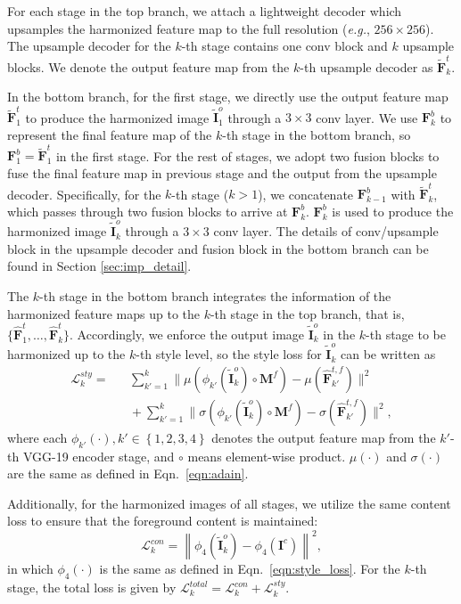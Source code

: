 \documentclass[letterpaper]{article} %
\begin{document}
For each stage in the top branch, we attach a lightweight decoder which upsamples the harmonized feature map to the full resolution (\emph{e.g.}, $256\times 256$). The upsample decoder for the $k$-th stage contains one conv block and $k$ upsample blocks. We denote the output feature map from the $k$-th upsample decoder as $\tilde{\bm{F}}^t_k$.

In the bottom branch, for the first stage, we directly use the output feature map $\tilde{\bm{F}}^t_1$ to produce the harmonized image $\tilde{\bm{I}}_1^o$ through a $3\times 3 $ conv layer. We use $\bm{F}^{b}_k$ to represent the final feature map of the $k$-th stage in the bottom branch, so $\bm{F}^{b}_1=\tilde{\bm{F}}^t_1$ in the first stage.
For the rest of stages, we adopt two fusion blocks to fuse the final feature map in previous stage and the output from the upsample decoder. Specifically, for the $k$-th stage ($k>1$), we concatenate $\bm{F}^{b}_{k-1}$ with $\tilde{\bm{F}}^t_k$, which passes through two fusion blocks to arrive at $\bm{F}^{b}_k$. $\bm{F}^{b}_k$ is used to produce the harmonized image  $\tilde{\bm{I}}^o_k$ through a $3\times 3 $ conv layer. The details of conv/upsample block in the upsample decoder and fusion block in the bottom branch can be found in Section \ref{sec:imp_detail}.


The $k$-th stage in the bottom branch integrates the information of the harmonized feature maps up to the $k$-th stage in the top branch, that is, $\{\hat{\bm{F}}^{t}_1,\ldots, \hat{\bm{F}}^{t}_k\}$. Accordingly, we enforce the output image $\tilde{\bm{I}}^o_k$ in the $k$-th stage to be harmonized up to the $k$-th style level, so the style loss \cite{huang2017arbitrary} for  $\tilde{\bm{I}}^o_k$ can be written as
\begin{eqnarray}\label{eqn:style_loss}
\mathcal{L}^{sty}_k=\!\!\!\!\!\!\!\!\!\!\!\!&&\sum_{k'=1}^{k}\|\mu\left(\phi_{k'}(\tilde{\bm{I}}^{o}_k)\circ \bm{M}^f\right)-\mu(\hat{\bm{F}}^{t,f}_{k'}) \|^2 \nonumber\\
&&\!\!\!\!\!\!\!\!\!\!\!\!+ \sum_{k'=1}^{k}\|\sigma\left(\phi_{k'}(\tilde{\bm{I}}^{o}_k)\circ \bm{M}^f\right)-\sigma(\hat{\bm{F}}^{t,f}_{k'}) \|^2,
\end{eqnarray}
where each $\phi_{k'}(\cdot), k'\in\left\{1,2,3,4\right\}$ denotes the output feature map from the $k'$-th VGG-19 encoder stage, and $\circ$ means element-wise product. $\mu(\cdot)$ and $\sigma(\cdot)$ are the same as defined in Eqn.~\ref{eqn:adain}.

Additionally, for the harmonized images of all stages, we utilize the same content loss \cite{gatys2016image} to ensure that the foreground content is maintained:
\begin{equation}\label{eqn:content_loss}
    \mathcal{L}^{con}_k =\left\|\phi_4(\tilde{\bm{I}}^o_k)-\phi_4(\bm{I}^c)\right\|^2,
\end{equation}
in which $\phi_{4}(\cdot)$ is the same as defined in Eqn.~\ref{eqn:style_loss}.
For the $k$-th stage, the total loss is given by $\mathcal{L}^{total}_k = \mathcal{L}^{con}_k + \mathcal{L}^{sty}_k$.
\end{document}
